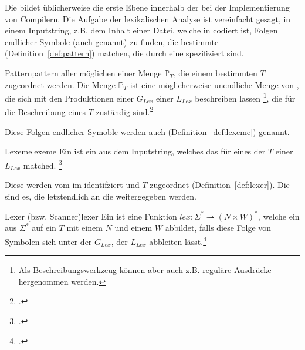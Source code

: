 Die  bildet üblicherweise die erste Ebene innerhalb der  bei der Implementierung von Compilern. Die Aufgabe der lexikalischen Analyse ist vereinfacht gesagt, in einem Inputstring, z.B. dem Inhalt einer Datei, welche in  codiert ist, Folgen endlicher Symbole (auch  genannt) zu finden, die bestimmte  (Definition~\ref{def:pattern}) matchen, die durch eine  spezifiziert sind.

\begin{Definition}{Pattern}{pattern}
   aller möglichen  einer Menge $\mathbb{P}_{T}$, die einem bestimmten  $T$ zugeordnet werden.
  Die Menge $\mathbb{P}_{T}$ ist eine möglicherweise unendliche Menge von , die sich mit den Produktionen einer  ${G}_{Lex}$ einer  ${L}_{Lex}$ beschreiben lassen \footnote{Als Beschreibungswerkzeug können aber auch z.B. reguläre Ausdrücke hergenommen werden.}, die für die Beschreibung eines  $T$ zuständig sind.\footcite{noauthor_what_nodate}
\end{Definition}

Diese Folgen endlicher Symoble werden auch  (Definition~\ref{def:lexeme}) genannt.

\begin{Definition}{Lexeme}{lexeme}
  Ein  ist ein  aus dem Inputstring, welches das  für eines der  $T$ einer  ${L}_{Lex}$ matched.
\footcite{noauthor_what_nodate}
\end{Definition}

Diese  werden vom  im  identifziert und  $T$ zugeordnet (Definition~\ref{def:lexer}). Die  sind es, die letztendlich an die  weitergegeben werden.

\begin{Definition}{Lexer (bzw. Scanner)}{lexer}
  Ein  ist eine  Funktion \hspace{0.2cm}$lex: \Sigma^{*} \rightharpoonup (N \times W)^{*}$, welche ein  aus $\Sigma^{*}$ auf ein  $T$ mit einem  $N$ und einem  $W$ abbildet, falls diese Folge von Symbolen sich unter der  ${G}_{Lex}$, der  ${L_{Lex}}$ abbleiten lässt.\footcite{noauthor_lecture-notes-2021_2022}
\end{Definition}

